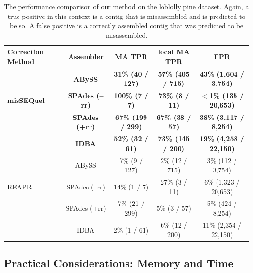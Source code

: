 \documentclass[doctor]{thesis}
\begin{document}
\begin{table}[h!]
\begin{center}
\caption{The performance comparison of our method on the loblolly pine dataset. 
Again, a true positive in this context is a contig that is misassembled and is predicted to be so. 
A false positive is a correctly assembled contig that was predicted to be misassembled.}
{\setlength{\tabcolsep}{1em}
\begin{tabular}{|l|c|c|c|c|}
\hline
\textbf{Correction Method}& \textbf{Assembler} 		&{\bf MA TPR}				& {\bf local MA TPR}					& \textbf{FPR}	 \\ \hline
 					& {\bf ABySS}				&  {\bf 31\% (40 / 127)}		&  {\bf 57\% (405 / 715)} 		  	 	& {\bf 43\% (1,604 / 3,754)}		 	 \\ 
{\sc\bf misSEQuel}		& {\bf SPAdes (--rr)}			&  {\bf 100\% (7 / 7)}			&  {\bf 73\% (8 / 11)}			 		& {\bf $<$1\% (135 / 20,653)	}	 	 \\ 
					& {\bf SPAdes (+rr)}			&  {\bf 67\% (199 / 299)}		& {\bf 67\% (38 / 57)}			 		& {\bf 38\% (3,117 / 8,254)} 		 	 \\ 
					& {\bf IDBA}				&  {\bf 52\% (32 / 61)}		&  {\bf 73\% (145 / 200)} 		  	 	& {\bf 19\% (4,258 / 22,150)}			 \\ 
\hline 
					& ABySS					& 7\% (9 / 127) 				& 2\% (12 / 715) 		  			& 3\% (112 / 3,754)		 \\  
 REAPR				& SPAdes (--rr)				& 14\% (1 / 7)				& 27\% (3 / 11)		 				& 6\% (1,323 / 20,653)		 	 \\ 
					& SPAdes (+rr)				& 7\% (21 / 299)			& 5\% (3 / 57)		 				& 5\% (424 / 8,254)	 \\ 
					& IDBA					& 2\% (1 / 61)				& 6\% (12 / 200)		  	 		&11\% (2,354 / 22,150)		 \\  
\hline
\end{tabular}}
\label{tab:roc_pine}
\end{center}
\end{table}


\subsection{Practical Considerations: Memory and Time} \label{mem_time}
\end{document}
